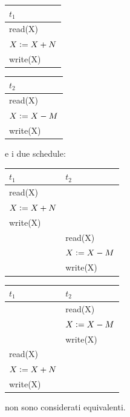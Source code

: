 \begin{multicols}{2}  
 \begin{tabular}{|l|}
   \hline
   $t_1$\\
   \hline
   read(X)\\ 
   $X\vcentcolon=X+N$\\ 
   write(X)\\ 
   \hline
  \end{tabular}



  \begin{tabular}{|l|}
  \hline
   $t_2$\\
   \hline
   read(X)\\ 
   $X\vcentcolon=X-M$\\ 
   write(X)\\
   \hline
  \end{tabular}

 \end{multicols}

 e i due schedule:
\begin{multicols}{2}  
 \begin{tabular}{|l|l|}
 \hline
 $t_1$ & $t_2$\\
 \hline
   read(X) & \\
   $X\vcentcolon=X+N$&\\ 
   write(X)&\\ 
   &read(X)\\ 
   &$X\vcentcolon=X-M$\\ 
   &write(X)\\
   \hline
  \end{tabular}

  \begin{tabular}{|l|l|}
   \hline
   $t_1$ & $t_2$\\
   \hline
   &read(X)\\ 
   &$X\vcentcolon=X-M$\\ 
   &write(X)\\
   read(X) & \\
   $X\vcentcolon=X+N$&\\ 
   write(X)&\\ 
   \hline
  \end{tabular}
 \end{multicols}
 
non sono considerati equivalenti.\\

